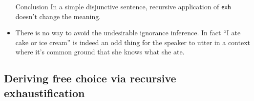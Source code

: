 \documentclass[landscape,cronos,paper=letter]{ling-handout}
\begin{document}
\begin{itemize}
    \begin{tcolorbox}
      Conclusion
      \tcblower
      In a simple disjunctive sentence, recursive application of $\textsf{exh}$ doesn't change the meaning.
      \end{tcolorbox}

  \item There is no way to avoid the undesirable ignorance inference. In fact \enquote{I ate cake or ice cream} is indeed an odd thing for the speaker to utter in a context where it's common ground that she knows what she ate.

\end{itemize}

\subsection{Deriving free choice via recursive exhaustification}
\end{document}
